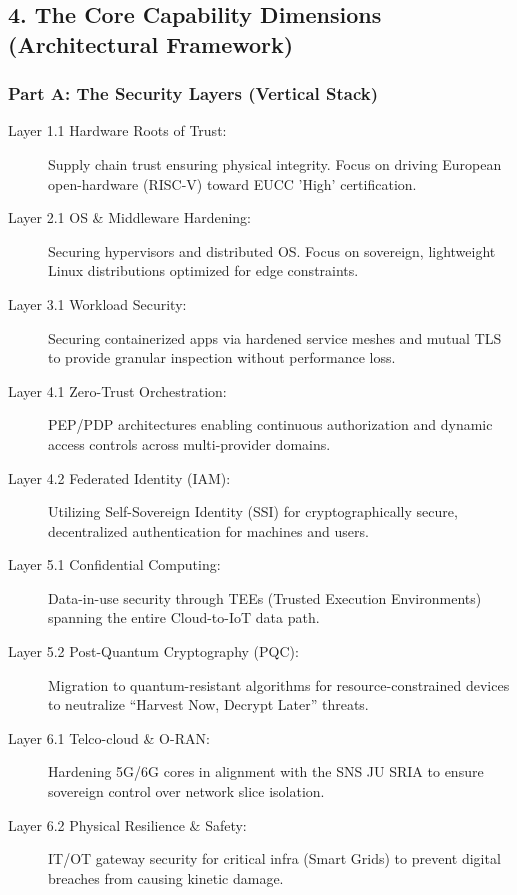 \documentclass[12pt,a4paper]{article}
\begin{document}
\subsection{4. The Core Capability Dimensions (Architectural Framework)}

\subsubsection{Part A: The Security Layers (Vertical Stack)}
\begin{description}
    \item[Layer 1.1 Hardware Roots of Trust:] Supply chain trust ensuring physical integrity. Focus on driving European open-hardware (RISC-V) toward EUCC 'High' certification.
    \item[Layer 2.1 OS \& Middleware Hardening:] Securing hypervisors and distributed OS. Focus on sovereign, lightweight Linux distributions optimized for edge constraints.
    \item[Layer 3.1 Workload Security:] Securing containerized apps via hardened service meshes and mutual TLS to provide granular inspection without performance loss.
    \item[Layer 4.1 Zero-Trust Orchestration:] PEP/PDP architectures enabling continuous authorization and dynamic access controls across multi-provider domains.
    \item[Layer 4.2 Federated Identity (IAM):] Utilizing Self-Sovereign Identity (SSI) for cryptographically secure, decentralized authentication for machines and users.
    \item[Layer 5.1 Confidential Computing:] Data-in-use security through TEEs (Trusted Execution Environments) spanning the entire Cloud-to-IoT data path.
    \item[Layer 5.2 Post-Quantum Cryptography (PQC):] Migration to quantum-resistant algorithms for resource-constrained devices to neutralize ``Harvest Now, Decrypt Later''  threats.
    \item[Layer 6.1 Telco-cloud \& O-RAN:] Hardening 5G/6G cores in alignment with the SNS JU SRIA to ensure sovereign control over network slice isolation.
    \item[Layer 6.2 Physical Resilience \& Safety:] IT/OT gateway security for critical infra (Smart Grids) to prevent digital breaches from causing kinetic damage.
\end{description}
\end{document}

